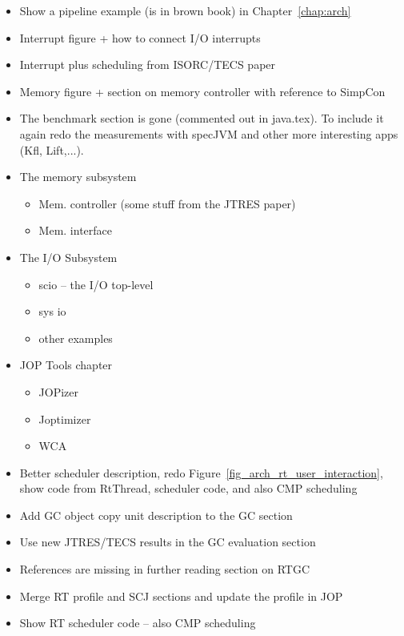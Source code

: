 \begin{itemize}
  \item Show a pipeline example (is in brown book) in
      Chapter~\ref{chap:arch}
  \item Interrupt figure + how to connect I/O interrupts
  \item Interrupt plus scheduling from ISORC/TECS paper
  \item Memory figure + section on memory controller with
      reference to SimpCon
  \item The benchmark section is gone (commented out in
      java.tex). To include it again redo the measurements with
      specJVM and other more interesting apps (Kfl, Lift,...).
  \item The memory subsystem
  \begin{itemize}
    \item Mem. controller (some stuff from the JTRES paper)
    \item Mem. interface
  \end{itemize}
  \item The I/O Subsystem
  \begin{itemize}
    \item scio -- the I/O top-level
    \item sys io
    \item other examples
  \end{itemize}
  \item JOP Tools chapter
  \begin{itemize}
    \item JOPizer
    \item Joptimizer
    \item WCA
  \end{itemize}
  \item Better scheduler description, redo
      Figure~\ref{fig_arch_rt_user_interaction}, show code from
      RtThread, scheduler code, and also CMP scheduling
  \item Add GC object copy unit description to the GC section
  \item Use new JTRES/TECS results in the GC evaluation section
  \item References are missing in further reading section on RTGC
  \item Merge RT profile and SCJ sections and update the profile
      in JOP
  \item Show RT scheduler code -- also CMP scheduling
\end{itemize}


